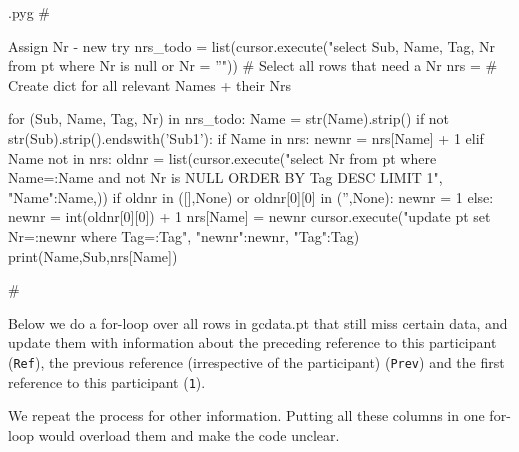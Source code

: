 \documentclass{report}
\makeatletter
\newcommand{\mi}[1]{\lstinline{#1}}
\newenvironment{python}{%
  \VerbatimEnvironment
  \minted@resetoptions
  \setkeys{minted@opt}{}
      \begin{VerbatimOut}{\jobname.pyg}}
{%
      \end{VerbatimOut}
      \minted@pygmentize{python}
      \DeleteFile{\jobname.pyg}}
\makeatother
\begin{document}
\begin{python}
#{{{ Assign Nr - new try
nrs_todo = list(cursor.execute("select Sub, Name, Tag, Nr from pt where Nr is null or Nr = ''"))  # Select all rows that need a Nr
nrs = {}    # Create dict for all relevant Names + their Nrs

for (Sub, Name, Tag, Nr) in nrs_todo:
    Name = str(Name).strip()
    if not str(Sub).strip().endswith('Sub1'):
        if Name in nrs:
            newnr = nrs[Name] + 1
        elif Name not in nrs:
            oldnr = list(cursor.execute("select Nr from pt where Name=:Name and not Nr is NULL ORDER BY Tag DESC LIMIT 1", {"Name":Name,}))
            if oldnr in ([],None) or oldnr[0][0] in ('',None):
                newnr = 1
            else:
                newnr = int(oldnr[0][0]) + 1
        nrs[Name] = newnr
        cursor.execute("update pt set Nr=:newnr where Tag=:Tag", {"newnr":newnr, "Tag":Tag})
        print(Name,Sub,nrs[Name])

#}}}
\end{python}

Below we do a for-loop over all rows in gcdata.pt that still miss certain data,
and update them with information about the preceding reference to this participant (\mi{Ref}),
the previous reference (irrespective of the participant) (\mi{Prev}) and the first reference
to this participant (\mi{1}).

We repeat the process for other information. Putting all these columns in one
for-loop would overload them and make the code unclear.
\end{document}
